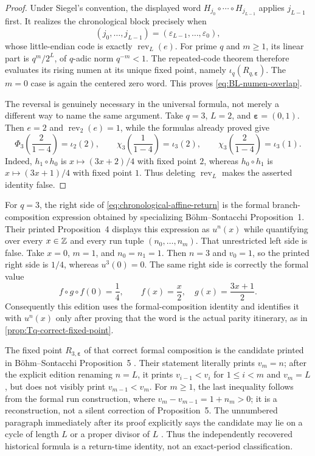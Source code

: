 \begin{proof}
Under Siegel's convention, the displayed word
$H_{j_0}\circ\cdots\circ H_{j_{L-1}}$ applies $j_{L-1}$ first.  It realizes
the chronological block precisely when
\[
 (j_0,\ldots,j_{L-1})
 =(\varepsilon_{L-1},\ldots,\varepsilon_0),
\]
whose little-endian code is exactly $\operatorname{rev}_L(e)$.  For prime
$q$ and $m\geq1$, its linear part is $q^m/2^L$, of $q$-adic norm $q^{-m}<1$.
The repeated-code theorem therefore evaluates its rising numen at its unique
fixed point, namely $\iota_q(R_{q,\boldsymbol\varepsilon})$.  The $m=0$ case
is again the centered
zero word.  This proves \cref{eq:BL-numen-overlap}.

The reversal is genuinely necessary in the universal formula, not merely a
different way to name the same argument.  Take $q=3$, $L=2$, and
$\boldsymbol\varepsilon=(0,1)$.  Then $e=2$ and
$\operatorname{rev}_2(e)=1$, while the formulas already proved give
\[
 \Phi_3\!\left(\frac{2}{1-4}\right)=\iota_2(2),
 \qquad
 \chi_3\!\left(\frac{1}{1-4}\right)=\iota_3(2),
 \qquad
 \chi_3\!\left(\frac{2}{1-4}\right)=\iota_3(1).
\]
Indeed, $h_1\circ h_0$ is $x\mapsto(3x+2)/4$ with fixed point $2$, whereas
$h_0\circ h_1$ is $x\mapsto(3x+1)/4$ with fixed point $1$.
Thus deleting $\operatorname{rev}_L$ makes the asserted identity false.
\end{proof}

\begin{sourceissue}
\label{status:Bohm-Sontacchi-Proposition-4}
For $q=3$, the right side of \cref{eq:chronological-affine-return} is the
formal branch-composition expression obtained by specializing
B\"ohm--Sontacchi Proposition~1.  Their printed Proposition~4 displays this
expression as $u^n(x)$ while quantifying over every $x\in\mathbb Z$ and every run
tuple $(n_0,\ldots,n_m)$.  That unrestricted left side is false.  Take
$x=0$, $m=1$, and $n_0=n_1=1$.  Then $n=3$ and $v_0=1$, so the printed right
side is $1/4$, whereas $u^3(0)=0$.  The same right side is correctly the
formal value
\[
 f\circ g\circ f(0)=\frac14,
 \qquad f(x)=\frac{x}{2},\quad g(x)=\frac{3x+1}{2}.
\]
Consequently this edition uses the formal-composition identity and identifies
it with $u^n(x)$ only after proving that the word is the actual parity
itinerary, as in \cref{prop:Tq-correct-fixed-point}.
\end{sourceissue}

The fixed point $R_{3,\boldsymbol\varepsilon}$ of that correct formal
composition is the candidate printed in B\"ohm--Sontacchi Proposition~5
\cite[p.~263]{BohmSontacchi}.  Their statement literally prints $v_m=n$;
after the explicit edition renaming $n=L$, it prints
$v_{i-1}<v_i$ for $1\leq i<m$ and $v_m=L$, but does not visibly print
$v_{m-1}<v_m$.  For $m\geq1$, the last inequality follows from the formal run
construction, where $v_m-v_{m-1}=1+n_m>0$; it is a reconstruction, not a
silent correction of Proposition~5.  The unnumbered paragraph immediately
after its proof explicitly says the candidate may lie on a cycle of length
$L$ or a proper divisor of $L$ \cite[p.~264]{BohmSontacchi}.  Thus the
independently recovered historical formula is a return-time identity, not an
exact-period classification.

